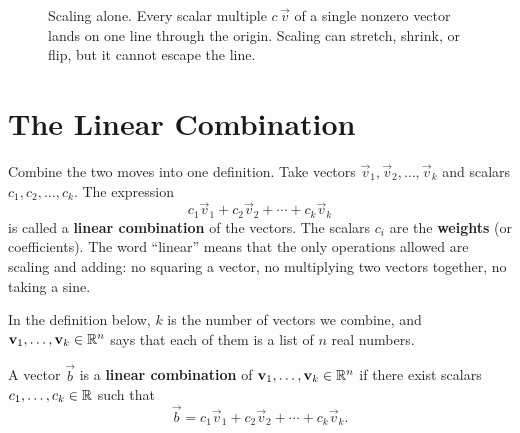 \begin{figure}[H]
\centering
{}
\caption{Scaling alone. Every scalar multiple $c\,\vec{v}$ of a single nonzero vector lands on one line through the origin. Scaling can stretch, shrink, or flip, but it cannot escape the line.}
\label{ch03:scaling-line}
\end{figure}

\section{The Linear Combination}

Combine the two moves into one definition. Take vectors $\vec{v}_1, \vec{v}_2, \dots, \vec{v}_k$ and scalars $c_1, c_2, \dots, c_k$. The expression
\[
  c_1 \vec{v}_1 + c_2 \vec{v}_2 + \cdots + c_k \vec{v}_k
\]
is called a \textbf{linear combination} of the vectors. The scalars $c_i$ are the \textbf{weights} (or coefficients). The word ``linear'' means that the only operations allowed are scaling and adding: no squaring a vector, no multiplying two vectors together, no taking a sine.

In the definition below, $k$ is the number of vectors we combine, and $\mathbf{v}_1,\dots,\mathbf{v}_k \in \mathbb{R}^n$ says that each of them is a list of $n$ real numbers.

\begin{definition}\label{ch03:def-lincomb}
A vector $\vec{b}$ is a \textbf{linear combination} of $\mathbf{v}_1,\dots,\mathbf{v}_k \in \mathbb{R}^n$ if there exist scalars $c_1,\dots,c_k \in \mathbb{R}$ such that
\[
  \vec{b} = c_1\vec{v}_1 + c_2\vec{v}_2 + \cdots + c_k\vec{v}_k.
\]
\end{definition}

